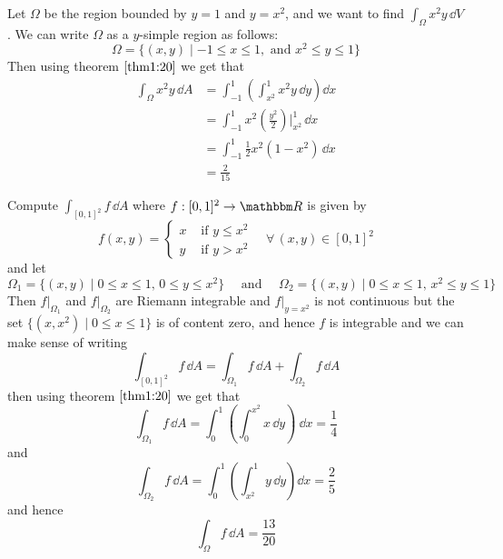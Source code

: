\documentclass[../Analysis-3]{subfiles}
\begin{document}
\begin{Eg}{}{}
    Let $\Omega$ be the region bounded by $y = 1$ and $y = x^2$, and we want to find $\int_{\Omega} x^2y \, \dd V$. We can write $\Omega$ as a $y$-simple region as follows: 
    \[
        \Omega = \{ (x,y) \mid -1 \leq x \leq 1, \mbox{ and } x^2 \leq y \leq 1 \}    
    \]
    Then using theorem $\ref{thm1:20}$ we get that 
    \begin{align*}
        \int_{\Omega} x^2y \, \dd A &= \int_{-1}^1 \left( \int_{x^2}^1 x^2y \, \dd y\right)\dd x \\ 
        &= \int_{-1}^1 x^2 \left( \frac{y^2}{2} \right)\bigg\vert_{x^2}^1 \, \dd x \\ 
        &= \int_{-1}^1 \frac{1}{2} x^2(1-x^2) \, \dd x \\ 
        &= \frac{2}{15}
    \end{align*}
\end{Eg}

\begin{Eg}{}{}
    Compute $\int_{[0,1]^2} f \, \dd A$ where $f : [0,1]^2 \to \R$ is given by
    \[
        f(x,y) = \begin{cases}
            x & \mbox{ if } y \leq x^2 \\ y & \mbox{ if } y > x^2 
        \end{cases} \quad \forall \, (x,y) \in [0,1]^2   
    \]
    and let 
    \[
        \Omega_1 = \{ (x,y) \mid 0 \leq x \leq 1, \, 0 \leq y \leq x^2 \} \quad \mbox{ and } \quad \Omega_2 = \{ (x,y) \mid 0 \leq x \leq 1, \, x^2 \leq y \leq 1 \}    
    \]
    Then $f\vert_{\Omega_1}$ and $f\vert_{\Omega_2}$ are Riemann integrable and $f\vert_{y=x^2}$ is not continuous but the set $\{ (x,x^2) \mid 0 \leq x \leq 1 \}$ is of content zero, and hence $f$ is integrable and we can make sense of writing 
    \[
        \int_{[0,1]^2} f \, \dd A = \int_{\Omega_1} f \, \dd A + \int_{\Omega_2} f \, \dd A     
    \]
    then using theorem $\ref{thm1:20}$ we get that 
    \[
        \int_{\Omega_1} f \, \dd A = \int_0^1 \left( \int_0^{x^2} x \, \dd y \right)\ \dd x = \frac{1}{4}     
    \]
    and 
    \[
        \int_{\Omega_2} f \, \dd A = \int_0^1 \left( \int_{x^2}^1 y \, \dd y\right)\dd x = \frac{2}{5}    
    \]
    and hence
    \[
        \int_{\Omega} f \, \dd A = \frac{13}{20}
    \]
\end{Eg}
\end{document}
